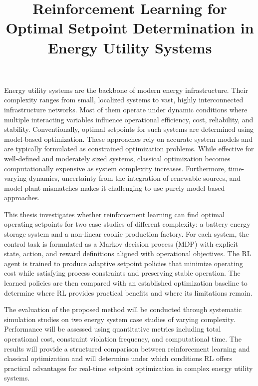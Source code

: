 
\title{Reinforcement Learning for Optimal Setpoint Determination in Energy Utility Systems}
\maketitle

\par
Energy utility systems are the backbone of modern energy infrastructure. Their complexity ranges from small, localized systems to vast, highly interconnected infrastructure networks. Most of them operate under dynamic conditions where multiple interacting variables influence operational efficiency, cost, reliability, and stability. Conventionally, optimal setpoints for such systems are determined using model-based optimization. These approaches rely on accurate system models and are typically formulated as constrained optimization problems. While effective for well-defined and moderately sized systems, classical optimization becomes computationally expensive as system complexity increases. Furthermore, time-varying dynamics, uncertainty from the integration of renewable sources, and model-plant mismatches makes it challenging to use purely model-based approaches.

\vspace{0.5pt}
\par
This thesis investigates whether reinforcement learning can find optimal operating setpoints for two case studies of different complexity: a battery energy storage system and a non-linear cookie production factory. For each system, the control task is formulated as a Markov decision process (MDP) with explicit state, action, and reward definitions aligned with operational objectives. The RL agent is trained to produce adaptive setpoint policies that minimize operating cost while satisfying process constraints and preserving stable operation. The learned policies are then compared with an established optimization baseline to determine where RL provides practical benefits and where its limitations remain.

\vspace{0.5pt}
\par
The evaluation of the proposed method will be conducted through systematic simulation studies on two energy system case studies of varying complexity. Performance will be assessed using quantitative metrics including total operational cost, constraint violation frequency, and computational time. The results will provide a structured comparison between reinforcement learning and classical optimization and will determine under which conditions RL offers practical advantages for real-time setpoint optimization in complex energy utility systems. 
